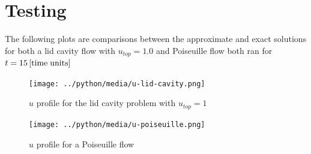\documentclass[12pt]{article}
\begin{document}
\section{Testing}
The following plots are comparisons between the approximate and exact
solutions for both a lid cavity flow with $u_{top} = 1.0$ and 
Poiseuille flow both ran for $t=\SI{15}{\left[time\;units\right]}$
\begin{figure}[H]
    \texttt{[image: ../python/media/u-lid-cavity.png]}
    \caption{$u$ profile for the lid cavity problem with $u_{top} =1$}
\end{figure}
\begin{figure}[H]
    \texttt{[image: ../python/media/u-poiseuille.png]}
    \caption{$u$ profile for a Poiseuille flow}
\end{figure}
\vfill
        
\end{document}
